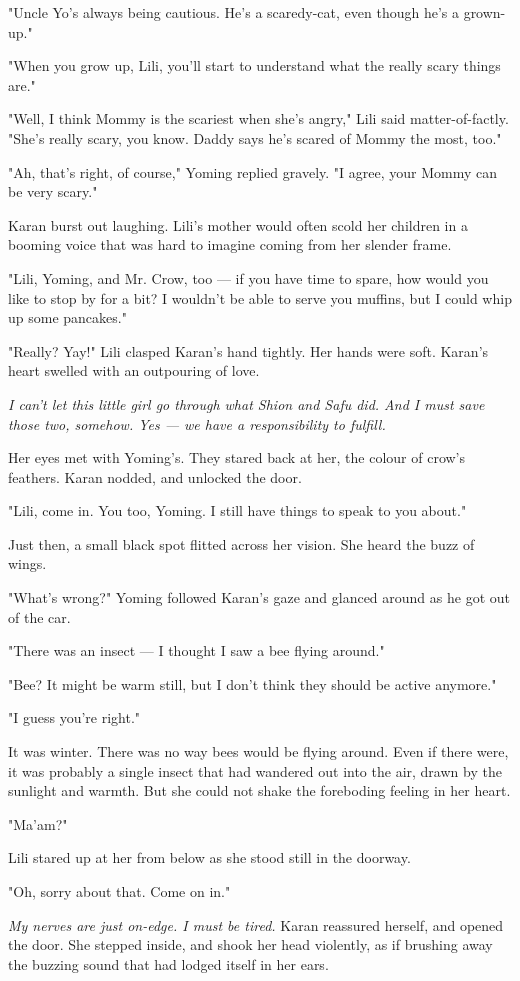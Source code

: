 "Uncle Yo's always being cautious. He's a scaredy-cat, even though he's
a grown-up."

"When you grow up, Lili, you'll start to understand what the really
scary things are."

"Well, I think Mommy is the scariest when she's angry," Lili said
matter-of-factly. "She's really scary, you know. Daddy says he's scared
of Mommy the most, too."

"Ah, that's right, of course," Yoming replied gravely. "I agree, your
Mommy can be very scary."

Karan burst out laughing. Lili's mother would often scold her children
in a booming voice that was hard to imagine coming from her slender
frame.

"Lili, Yoming, and Mr. Crow, too --- if you have time to spare, how would
you like to stop by for a bit? I wouldn't be able to serve you muffins,
but I could whip up some pancakes."

"Really? Yay!" Lili clasped Karan's hand tightly. Her hands were soft.
Karan's heart swelled with an outpouring of love.

\emph{I can't let this little girl go through what Shion and Safu did. And I
must save those two, somehow. Yes --- we have a responsibility to fulfill.}

Her eyes met with Yoming's. They stared back at her, the colour of
crow's feathers. Karan nodded, and unlocked the door.

"Lili, come in. You too, Yoming. I still have things to speak to you
about."

Just then, a small black spot flitted across her vision. She heard the
buzz of wings.

"What's wrong?" Yoming followed Karan's gaze and glanced around as he
got out of the car.

"There was an insect --- I thought I saw a bee flying around."

"Bee? It might be warm still, but I don't think they should be active
anymore."

"I guess you're right."

It was winter. There was no way bees would be flying around. Even if
there were, it was probably a single insect that had wandered out into
the air, drawn by the sunlight and warmth. But she could not shake the
foreboding feeling in her heart.

"Ma'am?"

Lili stared up at her from below as she stood still in the doorway.

"Oh, sorry about that. Come on in."

\emph{My nerves are just on-edge. I must be tired.} Karan reassured herself,
and opened the door. She stepped inside, and shook her head violently,
as if brushing away the buzzing sound that had lodged itself in her
ears.